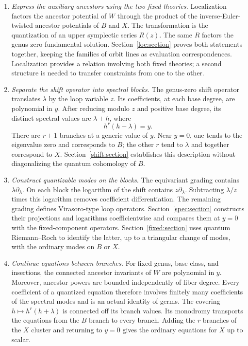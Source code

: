 \begin{enumerate}
\item \emph{Express the auxiliary ancestors using the two
fixed theories.}
Localization factors the ancestor potential of $W$
through the product of the inverse-Euler-twisted ancestor
potentials of $B$ and $X$. The transformation is the
quantization of an upper symplectic series $R(z)$.
The same $R$ factors the genus-zero fundamental solution.
Section~\ref{loc:section} proves both statements together,
keeping the families of orbit lines as evaluation
correspondences. Localization provides a relation involving
both fixed theories; a second structure is needed to transfer
constraints from one to the other.

\item \emph{Separate the shift operator into spectral blocks.}
The genus-zero shift operator translates $\lambda$ by the
loop variable $z$. Its coefficients, at each base degree,
are polynomial in $y$. After reducing modulo $z$ and
positive base degree, its distinct spectral values are
$\lambda+h$, where
\[
                         h^r(h+\lambda)=y.
\]
There are $r+1$ branches at a generic value of $y$.
Near $y=0$, one tends to the eigenvalue zero and corresponds
to $B$; the other $r$ tend to $\lambda$ and together
correspond to $X$. Section~\ref{shift:section} establishes
this description without diagonalizing the quantum
cohomology of $B$.

\item \emph{Construct quantizable modes on the blocks.}
The equivariant grading contains
$\lambda\partial_\lambda$. On each block the logarithm
of the shift contains $z\partial_\lambda$.
Subtracting $\lambda/z$ times this logarithm removes
coefficient differentiation. The remaining grading defines
Virasoro-type loop operators.
Section~\ref{spec:section} constructs their projections
and logarithms coefficientwise and compares them at
$y=0$ with the fixed-component operators.
Section~\ref{fixed:section} uses quantum Riemann--Roch
to identify the latter, up to a triangular change of modes,
with the ordinary modes on $B$ or $X$.

\item \emph{Continue equations between branches.}
For fixed genus, base class, and insertions, the connected
ancestor invariants of $W$ are polynomial in $y$.
Moreover, ancestor powers are bounded independently of
fiber degree. Every coefficient of a quantized equation
therefore involves finitely many coefficients of the
spectral modes and is an actual identity of germs.
The covering $h\mapsto h^r(h+\lambda)$ is connected off
its branch values. Its monodromy transports the equations
from the $B$ branch to every branch. Adding the $r$
branches of the $X$ cluster and returning to $y=0$
gives the ordinary equations for $X$ up to scalar.


\end{enumerate}
